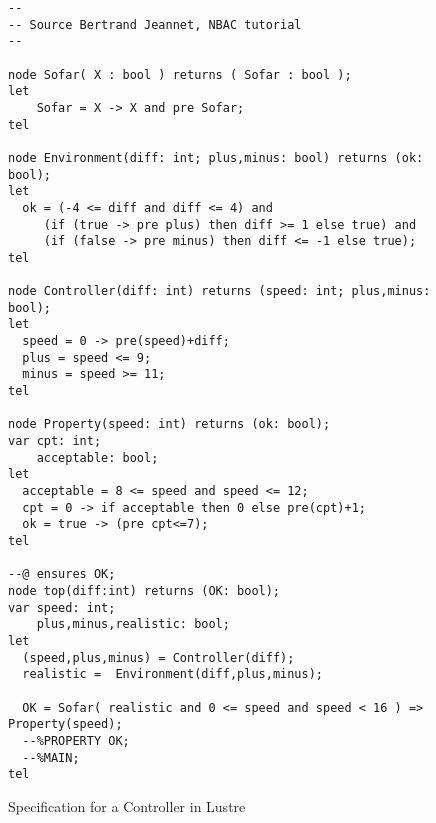  \begin{figure}[H]
 \begin{lstlisting}[basicstyle=\ttfamily\footnotesize]
--
-- Source Bertrand Jeannet, NBAC tutorial
--

node Sofar( X : bool ) returns ( Sofar : bool );
let
    Sofar = X -> X and pre Sofar;
tel

node Environment(diff: int; plus,minus: bool) returns (ok: bool);
let
  ok = (-4 <= diff and diff <= 4) and 
     (if (true -> pre plus) then diff >= 1 else true) and
     (if (false -> pre minus) then diff <= -1 else true);
tel

node Controller(diff: int) returns (speed: int; plus,minus: bool);
let
  speed = 0 -> pre(speed)+diff;
  plus = speed <= 9;
  minus = speed >= 11;
tel

node Property(speed: int) returns (ok: bool);
var cpt: int;
    acceptable: bool;
let
  acceptable = 8 <= speed and speed <= 12;
  cpt = 0 -> if acceptable then 0 else pre(cpt)+1;
  ok = true -> (pre cpt<=7);
tel

--@ ensures OK;
node top(diff:int) returns (OK: bool);
var speed: int; 
    plus,minus,realistic: bool;
let
  (speed,plus,minus) = Controller(diff);
  realistic =  Environment(diff,plus,minus);

  OK = Sofar( realistic and 0 <= speed and speed < 16 ) => Property(speed);
  --%PROPERTY OK;
  --%MAIN;
tel 
\end{lstlisting}
 \caption{Specification for a Controller in Lustre}
 \label{fig:example}
 \end{figure}
 

\label{sec:cstudies}

